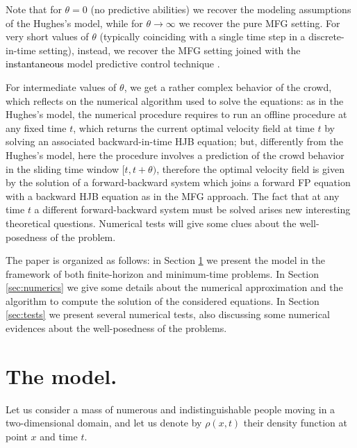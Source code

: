 \documentclass{cmslatex}
\renewcommand{\r}{\rho}
\newcommand{\REV}[1]{\textcolor{black}{#1}}
\begin{document}
Note that for $\theta=0$ (no predictive abilities) we recover the modeling assumptions of the Hughes's model, while for $\theta\to\infty$ we recover the pure MFG setting. 
For very short values of $\theta$ (typically coinciding with a single time step in a discrete-in-time setting), instead, we recover the MFG setting joined with the \REV{instantaneous} model predictive control technique \cite{degond2017}. 

For intermediate values of $\theta$, we get a rather complex behavior of the crowd, which reflects on the numerical algorithm used to solve the equations: as in the Hughes's model, the numerical procedure requires to run an offline procedure at any fixed time $t$, which returns the current optimal velocity field at time $t$ by solving an associated backward-in-time HJB equation; but, differently from the Hughes's model, here the procedure involves a prediction of the crowd behavior in the sliding time window $[t,t+\theta)$, therefore the optimal velocity field is given by the solution of a forward-backward system which joins a forward FP equation with a backward HJB equation as in the MFG approach.
The fact that at any time $t$ a different forward-backward system must be solved arises new interesting theoretical questions. Numerical tests will give some clues about the well-posedness of the problem.

\medskip


The paper is organized as follows:
in Section \ref{sec:model} we present the model in the framework of both finite-horizon and minimum-time problems. In Section \ref{sec:numerics} we give some details about the numerical approximation and the algorithm to compute the solution of the considered equations.
In Section \ref{sec:tests} we present several numerical tests, also discussing some numerical evidences about the well-posedness of the problems. 


\section{The model.}\label{sec:model}
Let us consider a mass of numerous and indistinguishable people moving in a two-dimensional domain, and let us denote by $\r(x,t)$ their density function at point $x$ and time $t$.
\end{document}

